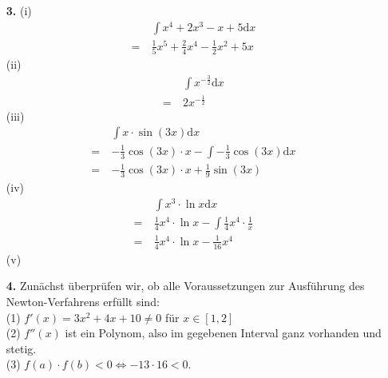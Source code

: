 \documentclass[a4paper,11pt]{article}
\begin{document}
\begin{enumerate}
        \item[\textbf{3.}]
	        \subitem (i)
                \begin{align*}
                    &\int x^4+2x^3-x+5 \mathrm{d}x& \\
                    = \ &\frac{1}{5}x^5+\frac{2}{4}x^4-\frac{1}{2}x^2+5x&
                \end{align*}
            \subitem (ii)
                \begin{align*}
                    &\int x^{-\frac{3}{2}} \mathrm{d}x& \\
                    = \ &2x^{-\frac{1}{2}}&
                \end{align*}
            \subitem (iii)
                \begin{align*}
                    &\int x \cdot \sin(3x) \mathrm{d}x& \\
                    = \ &-\frac{1}{3} \cos(3x) \cdot x - \int -\frac{1}{3} \cos(3x) \mathrm{d}x& \\
                    = \ &-\frac{1}{3} \cos(3x) \cdot x + \frac{1}{9} \sin(3x)&
                \end{align*}
            \subitem (iv)
                \begin{align*}
                    &\int x^3 \cdot \ln x \mathrm{d}x& \\
                    = \ &\frac{1}{4}x^4 \cdot \ln x - \int \frac{1}{4}x^4 \cdot \frac{1}{x}& \\
                    = \ &\frac{1}{4}x^4 \cdot \ln x - \frac{1}{16}x^4&
                \end{align*}
            \subitem (v)
        \item[\textbf{4.}]
            Zunächst überprüfen wir, ob alle Voraussetzungen zur Ausführung des Newton-Verfahrens erfüllt sind:\\
            (1) $f'(x)=3x^2+4x+10 \neq 0$ für $x \in [1,2]$\\
            (2) $f''(x)$ ist ein Polynom, also im gegebenen Interval ganz vorhanden und stetig. \\
            (3) $f(a) \cdot f(b) < 0 \Leftrightarrow -13 \cdot 16 < 0$. \\

\end{enumerate}
\end{document}
